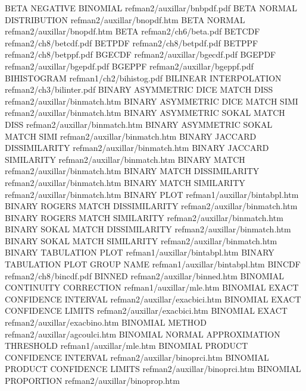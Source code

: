 BETA NEGATIVE BINOMIAL                  refman2/auxillar/bnbpdf.pdf
BETA NORMAL DISTRIBUTION                refman2/auxillar/bnopdf.htm
BETA NORMAL                             refman2/auxillar/bnopdf.htm
BETA                                    refman2/ch6/beta.pdf
BETCDF                                  refman2/ch8/betcdf.pdf
BETPDF                                  refman2/ch8/betpdf.pdf
BETPPF                                  refman2/ch8/betppf.pdf
BGECDF                                  refman2/auxillar/bgecdf.pdf
BGEPDF                                  refman2/auxillar/bgepdf.pdf
BGEPPF                                  refman2/auxillar/bgeppf.pdf
BIHISTOGRAM                             refman1/ch2/bihistog.pdf
BILINEAR INTERPOLATION                  refman2/ch3/bilinter.pdf
BINARY ASYMMETRIC DICE MATCH DISS       refman2/auxillar/binmatch.htm
BINARY ASYMMETRIC DICE MATCH SIMI       refman2/auxillar/binmatch.htm
BINARY ASYMMETRIC SOKAL MATCH DISS      refman2/auxillar/binmatch.htm
BINARY ASYMMETRIC SOKAL MATCH SIMI      refman2/auxillar/binmatch.htm
BINARY JACCARD DISSIMILARITY            refman2/auxillar/binmatch.htm
BINARY JACCARD SIMILARITY               refman2/auxillar/binmatch.htm
BINARY MATCH                            refman2/auxillar/binmatch.htm
BINARY MATCH DISSIMILARITY              refman2/auxillar/binmatch.htm
BINARY MATCH SIMILARITY                 refman2/auxillar/binmatch.htm
BINARY PLOT                             refman1/auxillar/bintabpl.htm
BINARY ROGERS MATCH DISSIMILARITY       refman2/auxillar/binmatch.htm
BINARY ROGERS MATCH SIMILARITY          refman2/auxillar/binmatch.htm
BINARY SOKAL MATCH DISSIMILARITY        refman2/auxillar/binmatch.htm
BINARY SOKAL MATCH SIMILARITY           refman2/auxillar/binmatch.htm
BINARY TABULATION PLOT                  refman1/auxillar/bintabpl.htm
BINARY TABULATION PLOT GROUP NAME       refman1/auxillar/bintabpl.htm
BINCDF                                  refman2/ch8/bincdf.pdf
BINNED                                  refman2/auxillar/binned.htm
BINOMIAL CONTINUITY CORRECTION          refman1/auxillar/mle.htm
BINOMIAL EXACT CONFIDENCE INTERVAL      refman2/auxillar/exacbici.htm
BINOMIAL EXACT CONFIDENCE LIMITS        refman2/auxillar/exacbici.htm
BINOMIAL EXACT                          refman2/auxillar/exacbino.htm
BINOMIAL METHOD                         refman2/auxillar/agcoulci.htm
BINOMIAL NORMAL APPROXIMATION THRESHOLD refman1/auxillar/mle.htm
BINOMIAL PRODUCT CONFIDENCE INTERVAL    refman2/auxillar/binoprci.htm
BINOMIAL PRODUCT CONFIDENCE LIMITS      refman2/auxillar/binoprci.htm
BINOMIAL PROPORTION                     refman2/auxillar/binoprop.htm
